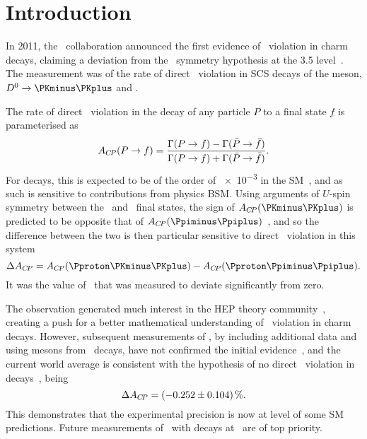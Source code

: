 \chapter{Introduction}
\label{chap:cpv:introduction}

In 2011, the \lhcb\ collaboration announced the first evidence of \CP\ 
violation in charm decays, claiming a deviation from the \CP\ symmetry 
hypothesis at the
\SI{3.5}{\sigma} level~\cite{Aaij:2011in}.
The measurement was of the rate of direct \CP\ violation in \ac{SCS} decays of 
the \PDzero meson, $\decay{\PDzero}{\KmKp}$ and \pimpip.

The rate of direct \CP\ violation in the decay of any particle $P$ to a final 
state $f$ is parameterised as
\begin{equation}
  \ACP(\decay{P}{f}) = \frac{%
    \Gamma(\decay{P}{f}) - \Gamma(\decay{\bar{P}}{\bar{f}})
  }{%
    \Gamma(\decay{P}{f}) + \Gamma(\decay{\bar{P}}{\bar{f}})
  }.
  \label{eqn:cpv:introduction:acp}
\end{equation}
For \decay{\PDzero}{\hmhp} decays, this is expected to be of the order of 
\num{e-3} in the \ac{SM}~\cite{Grossman:2006jg}, and as such is sensitive to 
contributions from physics \acl{BSM}.
Using arguments of $U$-spin symmetry between the \KmKp\ and \pimpip\ final 
states, the sign of $\ACP(\KmKp)$ is predicted to be opposite that of 
$\ACP(\pimpip)$~\cite{Grossman:2006jg}, and so the difference between the two 
is then particular sensitive to direct \CP\ violation in this system
\begin{equation}
  \dACP = \ACP(\pKK) - \ACP(\ppipi).
  \label{eqn:cpv:introduction:dacp_pure}
\end{equation}
It was the value of \dACP\ that was measured to deviate significantly from 
zero.

The observation generated much interest in the \acl{HEP} theory 
community~\cite{Lenz:2013pwa}, creating a push for a better mathematical 
understanding of \CP\ violation in charm decays.
However, subsequent measurements of \dACP, by including additional data and 
using \PDzero mesons from \PB\ decays, have not confirmed the initial 
evidence~\cite{Aaij:2014gsa,Aaij:2016cfh}, and the current world average is 
consistent with the hypothesis of no direct \CP\ violation in \PDzero 
decays~\cite{Amhis:2014hma}, being\footnotemark
\begin{equation}
  \dACP = \SI{-0.252 \pm 0.104}{\percent}.
  \label{eqn:cpv:introduction:dacp_world_average}
\end{equation}
This demonstrates that the experimental precision is now at level of some 
\ac{SM} predictions.
Future measurements of \dACP\ with \PDzero decays at \lhcb\ are of top 
priority.

